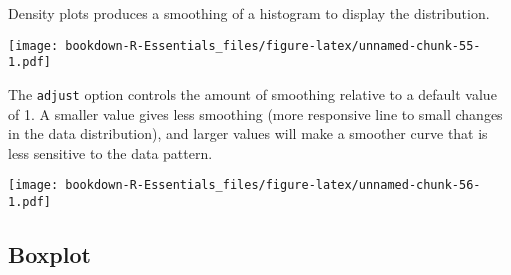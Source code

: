 \documentclass[
]{book}
\newenvironment{Shaded}{\begin{snugshade}}{\end{snugshade}}
\newcommand{\CommentTok}[1]{\textcolor[rgb]{0.56,0.35,0.01}{\textit{#1}}}
\newcommand{\DataTypeTok}[1]{\textcolor[rgb]{0.13,0.29,0.53}{#1}}
\newcommand{\DecValTok}[1]{\textcolor[rgb]{0.00,0.00,0.81}{#1}}
\newcommand{\FloatTok}[1]{\textcolor[rgb]{0.00,0.00,0.81}{#1}}
\newcommand{\KeywordTok}[1]{\textcolor[rgb]{0.13,0.29,0.53}{\textbf{#1}}}
\newcommand{\NormalTok}[1]{#1}
\newcommand{\OperatorTok}[1]{\textcolor[rgb]{0.81,0.36,0.00}{\textbf{#1}}}
\newcommand{\StringTok}[1]{\textcolor[rgb]{0.31,0.60,0.02}{#1}}
\begin{document}
Density plots produces a smoothing of a histogram to display the distribution.

\begin{Shaded}
\end{Shaded}

\texttt{[image: bookdown-R-Essentials\_files/figure-latex/unnamed-chunk-55-1.pdf]}

The \texttt{adjust} option controls the amount of smoothing relative to a default value of 1. A smaller value gives less smoothing (more responsive line to small changes in the data distribution), and larger values will make a smoother curve that is less sensitive to the data pattern.

\begin{Shaded}
\end{Shaded}

\texttt{[image: bookdown-R-Essentials\_files/figure-latex/unnamed-chunk-56-1.pdf]}

\hypertarget{boxplot}{%
\subsection{Boxplot}\label{boxplot}}
\end{document}
